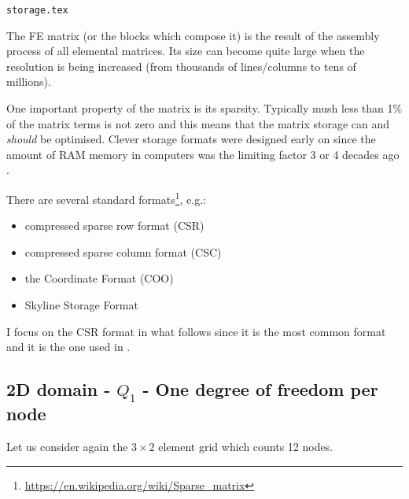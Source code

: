 \begin{flushright} {\tiny {\color{gray} \tt storage.tex}} \end{flushright}

The FE matrix (or the blocks which compose it) 
is the result of the assembly process of all elemental matrices. 
Its size can become quite large when the resolution is being increased (from thousands
of lines/columns to tens of millions).

One important property of the matrix is its sparsity. Typically mush less than 1\% of the 
matrix terms is not zero and this means that the matrix storage can and {\it should} be optimised. 
Clever storage formats were designed early on since the amount of RAM memory in computers
was the limiting factor 3 or 4 decades ago \cite{saad}.

There are several standard formats\footnote{\url{https://en.wikipedia.org/wiki/Sparse_matrix}}, e.g.:
\begin{itemize}
\item compressed sparse row format (CSR)  
\item compressed sparse column format (CSC)  
\item the Coordinate Format (COO)
\item Skyline Storage Format
\end{itemize}

I focus on  the CSR format in what follows since it is the most common format 
and it is the one used in \elefant. 

\subsection{2D domain - $Q_1$ - One degree of freedom per node}

Let us consider again the  $3\times2$ element grid which counts 12 nodes.

\begin{center}

\end{center}

